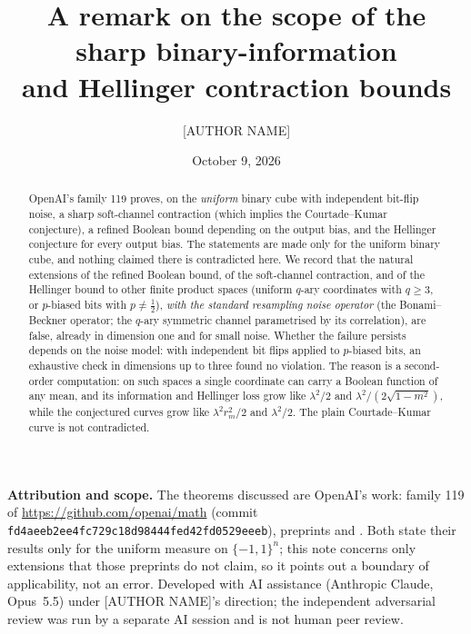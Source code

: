 \documentclass[11pt]{amsart}
\title[Scope of the sharp contraction bounds]{A remark on the scope of the sharp binary-information\\ and Hellinger contraction bounds}
\author{[AUTHOR NAME]}
\date{October 9, 2026}
\theoremstyle{remark}
\begin{document}
\begin{abstract}
OpenAI's family 119 proves, on the \emph{uniform} binary cube with independent bit-flip noise, a
sharp soft-channel contraction (which implies the Courtade--Kumar conjecture), a refined Boolean
bound depending on the output bias, and the Hellinger conjecture for every output bias. The
statements are made only for the uniform binary cube, and nothing claimed there is contradicted
here. We record that the natural extensions of the refined Boolean bound, of the soft-channel
contraction, and of the Hellinger bound to other finite product spaces (uniform $q$-ary
coordinates with $q\ge3$, or $p$-biased bits with $p\neq\frac12$), \emph{with the standard
resampling noise operator} (the Bonami--Beckner operator; the $q$-ary symmetric channel parametrised
by its correlation), are false, already in dimension one and for small noise. Whether the failure
persists depends on the noise model: with independent bit flips applied to $p$-biased bits, an
exhaustive check in dimensions up to three found no violation. The reason is a second-order computation: on such spaces a single
coordinate can carry a Boolean function of any mean, and its information and Hellinger loss grow
like $\lambda^2/2$ and $\lambda^2/(2\sqrt{1-m^2})$, while the conjectured curves grow like
$\lambda^2r_m^2/2$ and $\lambda^2/2$. The plain Courtade--Kumar curve is not contradicted.
\end{abstract}
\maketitle

\noindent\textbf{Attribution and scope.} The theorems discussed are OpenAI's work: family 119 of
\url{https://github.com/openai/math} (commit \nolinkurl{fd4aeeb2ee4fc729c18d98444fed42fd0529eeeb}),
preprints \cite{oai-ck} and \cite{oai-hel}. Both state their results only for the uniform measure on
$\{-1,1\}^n$; this note concerns only extensions that those preprints do not claim, so it points
out a boundary of applicability, not an error. Developed with AI assistance (Anthropic Claude,
Opus~5.5) under [AUTHOR NAME]'s direction; the independent adversarial review was run by a separate
AI session and is not human peer review.
\end{document}
